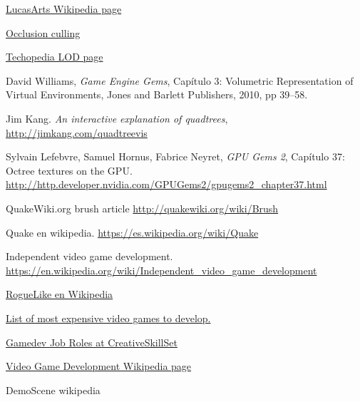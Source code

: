\begin{thebibliography}{99}


 \href{https://es.wikipedia.org/wiki/LucasArts}{LucasArts Wikipedia page}

 \href{https://en.wikipedia.org/wiki/Hidden_surface_determination}{Occlusion culling}

 \href{http://www.techopedia.com/definition/11791/level-of-detail-lod}{Techopedia LOD page}

 David Williams, \emph{Game Engine Gems}, Capítulo 3: Volumetric Representation of Virtual Environments, Jones and Barlett Publishers, 2010, pp 39--58.

 Jim Kang. \emph{An interactive explanation of quadtrees}, \href{http://jimkang.com/quadtreevis/}{http://jimkang.com/quadtreevis}

 Sylvain Lefebvre, Samuel Hornus, Fabrice Neyret, \emph{GPU Gems 2}, Capítulo 37: Octree textures on the GPU. \href{http://http.developer.nvidia.com/GPUGems2/gpugems2\_chapter37.html}{http://http.developer.nvidia.com/GPUGems2/gpugems2\_chapter37.html}

 QuakeWiki.org brush article \href{http://quakewiki.org/wiki/Brush}{http://quakewiki.org/wiki/Brush}

 Quake en wikipedia. \href{https://es.wikipedia.org/wiki/Quake}{https://es.wikipedia.org/wiki/Quake}

 Independent video game development. \href{https://en.wikipedia.org/wiki/Independent\_video\_game\_development}{https://en.wikipedia.org/wiki/Independent\_video\_game\_development}

 \href{https://es.wikipedia.org/wiki/Roguelike}{RogueLike en Wikipedia}

 \href{https://en.wikipedia.org/wiki/List_of_most_expensive_video_games_to_develop}{List of most expensive video games to develop.}

 \href{http://creativeskillset.org/creative_industries/games/job_roles}{Gamedev Job Roles at CreativeSkillSet}

 \href{https://en.wikipedia.org/wiki/Video_game_development#Roles}{Video Game Development Wikipedia page}

 DemoScene wikipedia


\end{thebibliography}
